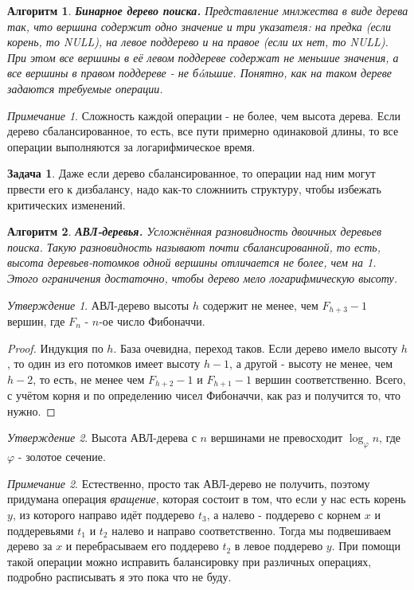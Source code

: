 \documentclass[a4paper]{article}
\theoremstyle{indented}
\newtheorem{alg}{Алгоритм}
\theoremstyle{definition}
\newtheorem{prob}{Задача}
\theoremstyle{remark}
\newtheorem{remark}{Примечание}
\newtheorem{stat}{Утверждение}
\begin{document}
\begin{alg}
    \textbf{Бинарное дерево поиска.} Представление мнлжества в виде дерева так, что вершина содержит одно значение и три указателя: на предка (если корень, то NULL), на левое поддерево и на правое (если их нет, то NULL). При этом все вершины в её левом поддереве содержат не меньшие значения, а все вершины в правом поддереве - не бóльшие. Понятно, как на таком дереве задаются требуемые операции.
\end{alg}

\begin{remark}
    Сложность каждой операции - не более, чем высота дерева. Если дерево сбалансированное, то есть, все пути примерно одинаковой длины, то все операции выполняются за логарифмическое время.
\end{remark}

\begin{prob}
    Даже если дерево сбалансированное, то операции над ним могут првести его к дизбалансу, надо как-то сложниить структуру, чтобы избежать критических изменений.
\end{prob}

\begin{alg}
    \textbf{АВЛ-деревья.} Усложнённая разновидность двоичных деревьев поиска. Такую разновидность называют \textit{почти сбалансированной}, то есть, высота деревьев-потомков одной вершины отличается не более, чем на 1. Этого ограничения достаточно, чтобы дерево мело логарифмическую высоту.
\end{alg}

\begin{stat}
    АВЛ-дерево высоты $h$ содержит не менее, чем $F_{h+3}-1$ вершин, где $F_n$ - $n$-ое число Фибоначчи.
\end{stat}

\begin{proof}
    Индукция по $h$. База очевидна, переход таков. Если дерево имело высоту $h$, то один из его потомков имеет высоту $h-1$, а другой - высоту не менее, чем $h-2$, то есть, не менее чем $F_{h+2}-1$ и $F_{h+1}-1$ вершин соответственно. Всего, с учётом корня и по определению чисел Фибоначчи, как раз и получится то, что нужно.
\end{proof}

\begin{stat}
    Высота АВЛ-дерева с $n$ вершинами не превосходит $\log_\varphi n$, где $\varphi$ - золотое сечение.
\end{stat}

\begin{remark}
    Естественно, просто так АВЛ-дерево не получить, поэтому придумана операция \textit{вращение}, которая состоит в том, что если у нас есть корень $y$, из которого направо идёт поддерево $t_3$, а налево - поддерево с корнем $x$ и поддеревьями $t_1$ и $t_2$ налево и направо соответственно. Тогда мы подвешиваем дерево за $x$ и перебрасываем его поддерево $t_2$ в левое поддерево $y$. При помощи такой операции можно исправить балансировку при различных операциях, подробно расписывать я это пока что не буду.
\end{remark}
\end{document}
